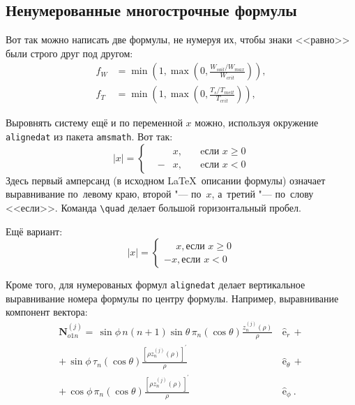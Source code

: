 \subsection{Ненумерованные многострочные формулы} \label{subsec:ch1/sec3/sub2}

Вот так можно написать две формулы, не нумеруя их, чтобы знаки <<равно>> были
строго друг под другом:
\begin{align}
  f_W & =  \min \left( 1, \max \left( 0, \frac{W_{soil} / W_{max}}{W_{crit}} \right)  \right), \nonumber \\
  f_T & =  \min \left( 1, \max \left( 0, \frac{T_s / T_{melt}}{T_{crit}} \right)  \right), \nonumber
\end{align}

Выровнять систему ещё и по переменной $ x $ можно, используя окружение
\verb|alignedat| из пакета \verb|amsmath|. Вот так:
\[
    |x| = \left\{
    \begin{alignedat}{2}
        &&x, \quad &\text{eсли } x\geqslant 0 \\
        &-&x, \quad & \text{eсли } x<0
    \end{alignedat}
    \right.
\]
Здесь первый амперсанд (в исходном \LaTeX\ описании формулы) означает
выравнивание по~левому краю, второй "--- по~$ x $, а~третий "--- по~слову
<<если>>. Команда \verb|\quad| делает большой горизонтальный пробел.

Ещё вариант:
\[
    |x|=
    \begin{cases}
    \phantom{-}x, \text{если } x \geqslant 0 \\
    -x, \text{если } x<0
    \end{cases}
\]

Кроме того, для  нумерованых формул \verb|alignedat| делает вертикальное
выравнивание номера формулы по центру формулы. Например, выравнивание
компонент вектора:
\begin{equation}
 \label{eq:2p3}
 \begin{alignedat}{2}
{\mathbf{N}}_{o1n}^{(j)} = \,{\sin} \phi\,n\!\left(n+1\right)
         {\sin}\theta\,
         \pi_n\!\left({\cos} \theta\right)
         \frac{
               z_n^{(j)}\!\left( \rho \right)
              }{\rho}\,
           &{\boldsymbol{\hat{\mathrm e}}}_{r}\,+   \\
+\,
{\sin} \phi\,
         \tau_n\!\left({\cos} \theta\right)
         \frac{
            \left[\rho z_n^{(j)}\!\left( \rho \right)\right]^{\prime}
              }{\rho}\,
            &{\boldsymbol{\hat{\mathrm e}}}_{\theta}\,+   \\
+\,
{\cos} \phi\,
         \pi_n\!\left({\cos} \theta\right)
         \frac{
            \left[\rho z_n^{(j)}\!\left( \rho \right)\right]^{\prime}
              }{\rho}\,
            &{\boldsymbol{\hat{\mathrm e}}}_{\phi}\:.
\end{alignedat}
\end{equation}

